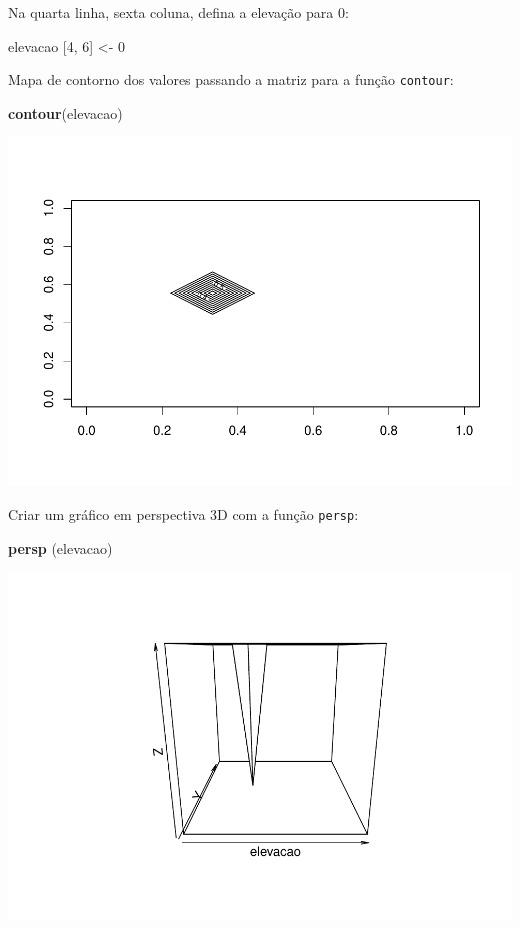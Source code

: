 \documentclass[
]{book}
\newenvironment{Shaded}{\begin{snugshade}}{\end{snugshade}}
\newcommand{\DecValTok}[1]{\textcolor[rgb]{0.00,0.00,0.81}{#1}}
\newcommand{\KeywordTok}[1]{\textcolor[rgb]{0.13,0.29,0.53}{\textbf{#1}}}
\newcommand{\NormalTok}[1]{#1}
\newcommand{\StringTok}[1]{\textcolor[rgb]{0.31,0.60,0.02}{#1}}
\begin{document}
Na quarta linha, sexta coluna, defina a elevação para 0:

\begin{Shaded}
\begin{Highlighting}[]
\NormalTok{elevacao [}\DecValTok{4}\NormalTok{, }\DecValTok{6}\NormalTok{] <-}\StringTok{ }\DecValTok{0}
\end{Highlighting}
\end{Shaded}

Mapa de contorno dos valores passando a matriz para a função \texttt{contour}:

\begin{Shaded}
\begin{Highlighting}[]
\KeywordTok{contour}\NormalTok{(elevacao)}
\end{Highlighting}
\end{Shaded}

\includegraphics{TudodoR_files/figure-latex/unnamed-chunk-71-1.pdf}

Criar um gráfico em perspectiva 3D com a função \texttt{persp}:

\begin{Shaded}
\begin{Highlighting}[]
\KeywordTok{persp}\NormalTok{ (elevacao)}
\end{Highlighting}
\end{Shaded}

\includegraphics{TudodoR_files/figure-latex/unnamed-chunk-72-1.pdf}
\end{document}
